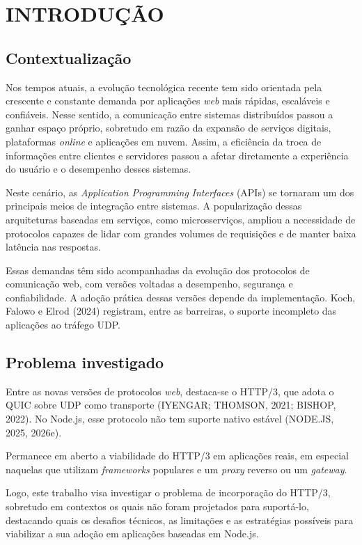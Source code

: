 ﻿\chapter{INTRODUÇÃO}\label{cap:intro}

\section{Contextualização}

Nos tempos atuais, a evolução tecnológica recente tem sido orientada pela crescente e constante demanda por aplicações \textit{web} mais rápidas, escaláveis e confiáveis. Nesse sentido, a comunicação entre sistemas distribuídos passou a ganhar espaço próprio, sobretudo em razão da expansão de serviços digitais, plataformas \textit{online} e aplicações em nuvem. Assim, a eficiência da troca de informações entre clientes e servidores passou a afetar diretamente a experiência do usuário e o desempenho desses sistemas.

Neste cenário, as \textit{Application}\textit{ }\textit{Programming}\textit{ Interfaces} (APIs) se tornaram um dos principais meios de integração entre sistemas. A popularização dessas arquiteturas baseadas em serviços, como microsserviços, ampliou a necessidade de protocolos capazes de lidar com grandes volumes de requisições e de manter baixa latência nas respostas.

Essas demandas têm sido acompanhadas da evolução dos protocolos de comunicação web, com versões voltadas a desempenho, segurança e confiabilidade. A adoção prática dessas versões depende da implementação. Koch, Falowo e Elrod (2024) registram, entre as barreiras, o suporte incompleto das aplicações ao tráfego UDP.

\section{Problema investigado}

Entre as novas versões de protocolos \textit{web}, destaca-se o HTTP/3, que adota o QUIC sobre UDP como transporte (IYENGAR; THOMSON, 2021; BISHOP, 2022). No Node.js, esse protocolo não tem suporte nativo estável (NODE.JS, 2025, 2026e).

Permanece em aberto a viabilidade do HTTP/3 em aplicações reais, em especial naquelas que utilizam \textit{frameworks} populares e um \textit{proxy} reverso ou um \textit{gateway}.

Logo, este trabalho visa investigar o problema de incorporação do HTTP/3, sobretudo em contextos os quais não foram projetados para suportá-lo, destacando quais os desafios técnicos, as limitações e as estratégias possíveis para viabilizar a sua adoção em aplicações baseadas em Node.js.

